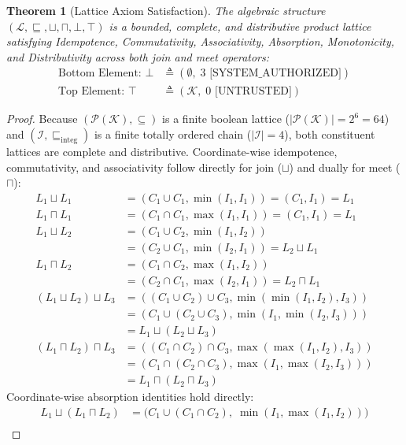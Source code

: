 \documentclass[conference,10pt]{IEEEtran}
\newtheorem{theorem}{Theorem}
\begin{document}
\begin{theorem}[Lattice Axiom Satisfaction]
The algebraic structure $(\mathcal{L}, \sqsubseteq, \sqcup, \sqcap, \bot, \top)$ is a bounded, complete, and distributive product lattice satisfying Idempotence, Commutativity, Associativity, Absorption, Monotonicity, and Distributivity across both join and meet operators:
\begin{align}
\text{Bottom Element: } \bot &\triangleq (\emptyset, \; 3 \text{ [SYSTEM\_AUTHORIZED]}) \\
\text{Top Element: } \top &\triangleq (\mathcal{K}, \; 0 \text{ [UNTRUSTED]})
\end{align}
\end{theorem}

\begin{proof}
Because $(\mathcal{P}(\mathcal{K}), \subseteq)$ is a finite boolean lattice ($|\mathcal{P}(\mathcal{K})| = 2^6 = 64$) and $(\mathcal{I}, \sqsubseteq_{\text{integ}})$ is a finite totally ordered chain ($|\mathcal{I}| = 4$), both constituent lattices are complete and distributive.
Coordinate-wise idempotence, commutativity, and associativity follow directly for join ($\sqcup$) and dually for meet ($\sqcap$):
\begin{align*}
L_1 \sqcup L_1 &= (C_1 \cup C_1, \min(I_1, I_1)) = (C_1, I_1) = L_1 \\
L_1 \sqcap L_1 &= (C_1 \cap C_1, \max(I_1, I_1)) = (C_1, I_1) = L_1 \\
L_1 \sqcup L_2 &= (C_1 \cup C_2, \min(I_1, I_2)) \\
&= (C_2 \cup C_1, \min(I_2, I_1)) = L_2 \sqcup L_1 \\
L_1 \sqcap L_2 &= (C_1 \cap C_2, \max(I_1, I_2)) \\
&= (C_2 \cap C_1, \max(I_2, I_1)) = L_2 \sqcap L_1 \\
(L_1 \sqcup L_2) \sqcup L_3 &= ((C_1 \cup C_2) \cup C_3, \min(\min(I_1, I_2), I_3)) \\
&= (C_1 \cup (C_2 \cup C_3), \min(I_1, \min(I_2, I_3))) \\
&= L_1 \sqcup (L_2 \sqcup L_3) \\
(L_1 \sqcap L_2) \sqcap L_3 &= ((C_1 \cap C_2) \cap C_3, \max(\max(I_1, I_2), I_3)) \\
&= (C_1 \cap (C_2 \cap C_3), \max(I_1, \max(I_2, I_3))) \\
&= L_1 \sqcap (L_2 \sqcap L_3)
\end{align*}
Coordinate-wise absorption identities hold directly:
\begin{align*}
L_1 \sqcup (L_1 \sqcap L_2) &= \big( C_1 \cup (C_1 \cap C_2), \; \min(I_1, \max(I_1, I_2)) \big) \\

\end{align*}
\end{proof}
\end{document}
